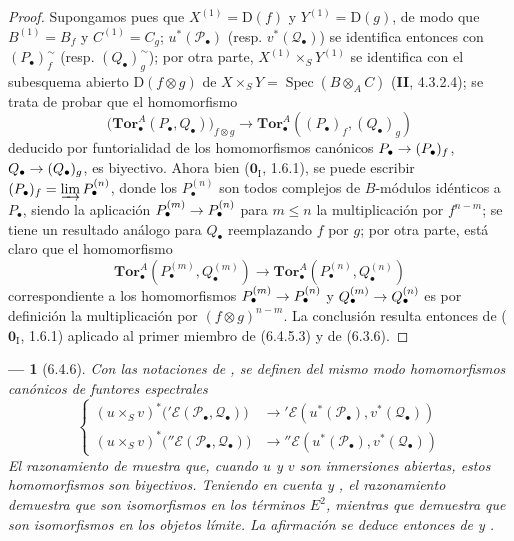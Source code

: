 \documentclass[10pt,oneside,openany]{book}
\theoremstyle{egaenv}\newtheorem*{env}{---}
\theoremstyle{egastatement}
\theoremstyle{egadescription}
\newcommand{\oldpage}[2][]{\marginnote{\normalfont\scriptsize\textbf{#1}\,|\,#2}\ignorespaces}
\renewcommand{\to}{\mathchoice{\longrightarrow}{\rightarrow}{\rightarrow}{\rightarrow}}
\begin{document}
\begin{proof}
Supongamos pues que $X^{(1)}=\mathrm D(f)$ y $Y^{(1)}=\mathrm D(g)$, de modo
que $B^{(1)}=B_f$ y $C^{(1)}=C_g$; $u^*(\mathscr P_\bullet)$ (resp.
$v^*(\mathscr Q_\bullet)$) se identifica entonces con
$(P_\bullet)_f^{\sim}$ (resp. $(Q_\bullet)_g^{\sim}$); por otra parte,
$X^{(1)}\times_S Y^{(1)}$ se identifica con el subesquema abierto
$\mathrm D(f\otimes g)$ de
$X\times_S Y=\operatorname{Spec}(B\otimes_A C)$ (\textbf{II}, 4.3.2.4); se trata de
probar que el homomorfismo
\[
  \bigl(\mathbf{Tor}_\bullet^A(P_\bullet,Q_\bullet)\bigr)_{f\otimes g}
  \longrightarrow
  \mathbf{Tor}_\bullet^A((P_\bullet)_f,(Q_\bullet)_g)
  \tag{6.4.5.3}\label{III.6.4.5.3.fr}
\]
\oldpage[III]{148}
deducido por funtorialidad de los homomorfismos canónicos
$P_\bullet\to(P_\bullet)_f$, $Q_\bullet\to(Q_\bullet)_g$, es biyectivo. Ahora bien
($\mathbf{0}_{\mathrm I}$, 1.6.1), se puede escribir
$(P_\bullet)_f=\varinjlim P_\bullet^{(n)}$, donde los $P_\bullet^{(n)}$ son todos
complejos de $B$-módulos idénticos a $P_\bullet$, siendo la aplicación
$P_\bullet^{(m)}\to P_\bullet^{(n)}$ para $m\leqslant n$ la
multiplicación por $f^{n-m}$; se tiene un resultado análogo para $Q_\bullet$
reemplazando $f$ por $g$; por otra parte, está claro que el homomorfismo
\[
  \mathbf{Tor}_\bullet^A(P_\bullet^{(m)},Q_\bullet^{(m)})
  \longrightarrow
  \mathbf{Tor}_\bullet^A(P_\bullet^{(n)},Q_\bullet^{(n)})
\]
correspondiente a los homomorfismos
$P_\bullet^{(m)}\to P_\bullet^{(n)}$ y
$Q_\bullet^{(m)}\to Q_\bullet^{(n)}$ es por definición la multiplicación
por $(f\otimes g)^{n-m}$. La conclusión resulta entonces de ($\mathbf{0}_{\mathrm I}$,
1.6.1) aplicado al primer miembro de (6.4.5.3) y de (6.3.6).
\end{proof}

\begin{env}[6.4.6]
\label{III.6.4.6}
Con las notaciones de , se definen del mismo modo
homomorfismos canónicos de funtores espectrales
\[
  \left\{
  \begin{aligned}
  (u\times_S v)^*\bigl('\mathscr E(\mathscr P_\bullet,\mathscr Q_\bullet)\bigr)
    &\longrightarrow
      '\mathscr E(u^*(\mathscr P_\bullet),v^*(\mathscr Q_\bullet))\\
  (u\times_S v)^*\bigl(''\mathscr E(\mathscr P_\bullet,\mathscr Q_\bullet)\bigr)
    &\longrightarrow
      ''\mathscr E(u^*(\mathscr P_\bullet),v^*(\mathscr Q_\bullet))
  \end{aligned}
  \right.
  \tag{6.4.6.1}\label{III.6.4.6.1.fr}
\]
El razonamiento de  muestra que, cuando $u$ y $v$
son \emph{inmersiones abiertas}, estos homomorfismos son \emph{biyectivos}.
Teniendo en cuenta  y , el
razonamiento demuestra que son isomorfismos en los términos $E^2$,
mientras que  demuestra que son isomorfismos en los
objetos límite. La afirmación se deduce entonces de
 y .
\end{env}
\end{document}
